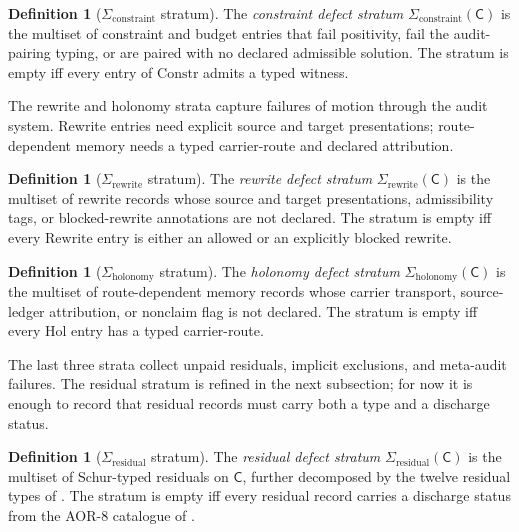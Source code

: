 \documentclass[11pt]{article}
\newcommand{\Sigconstr}{\Sigma_{\mathrm{constraint}}}
\newcommand{\Sigrewrite}{\Sigma_{\mathrm{rewrite}}}
\newcommand{\Sighol}{\Sigma_{\mathrm{holonomy}}}
\newcommand{\Sigres}{\Sigma_{\mathrm{residual}}}
\theoremstyle{definition}
\newtheorem{definition}[theorem]{Definition}
\begin{document}
\begin{definition}[$\Sigconstr$ stratum]\label{def:aor:sigma-constraint}
The \emph{constraint defect stratum} $\Sigconstr(\mathsf C)$ is the
multiset of constraint and budget entries that fail positivity, fail
the audit-pairing typing, or are paired with no declared admissible
solution.  The stratum is empty iff every entry of $\mathrm{Constr}$
admits a typed witness.
\end{definition}

The rewrite and holonomy strata capture failures of motion through the audit
system.  Rewrite entries need explicit source and target presentations;
route-dependent memory needs a typed carrier-route and declared attribution.

\begin{definition}[$\Sigrewrite$ stratum]\label{def:aor:sigma-rewrite}
The \emph{rewrite defect stratum} $\Sigrewrite(\mathsf C)$ is the
multiset of rewrite records whose source and target presentations,
admissibility tags, or blocked-rewrite annotations are not declared.
The stratum is empty iff every $\mathrm{Rewrite}$ entry is either an
allowed or an explicitly blocked rewrite.
\end{definition}

\begin{definition}[$\Sighol$ stratum]\label{def:aor:sigma-holonomy}
The \emph{holonomy defect stratum} $\Sighol(\mathsf C)$ is the multiset
of route-dependent memory records whose carrier transport, source-ledger
attribution, or nonclaim flag is not declared.  The stratum is empty
iff every $\mathrm{Hol}$ entry has a typed carrier-route.
\end{definition}

The last three strata collect unpaid residuals, implicit exclusions,
and meta-audit failures.  The residual stratum is refined in the next
subsection; for now it is enough to record that residual records must
carry both a type and a discharge status.

\begin{definition}[$\Sigres$ stratum]\label{def:aor:sigma-residual}
The \emph{residual defect stratum} $\Sigres(\mathsf C)$ is the multiset
of Schur-typed residuals on $\mathsf C$, further decomposed by the
twelve residual types of .  The
stratum is empty iff every residual record carries a discharge status
from the AOR-8 catalogue of .
\end{definition}
\end{document}
